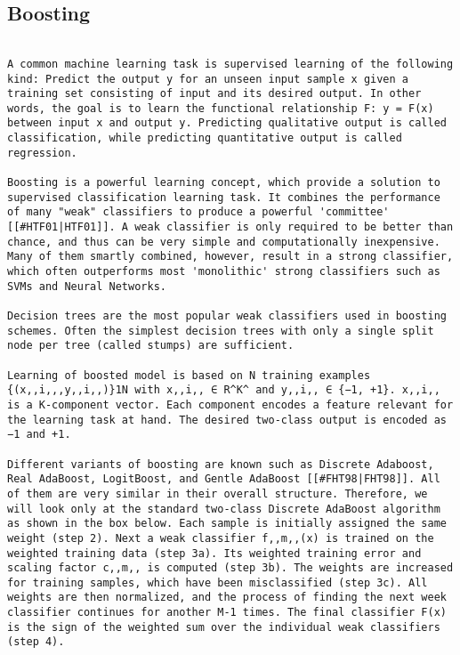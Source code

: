 \subsection{Boosting}
\begin{verbatim}

A common machine learning task is supervised learning of the following kind: Predict the output y for an unseen input sample x given a training set consisting of input and its desired output. In other words, the goal is to learn the functional relationship F: y = F(x) between input x and output y. Predicting qualitative output is called classification, while predicting quantitative output is called regression.

Boosting is a powerful learning concept, which provide a solution to supervised classification learning task. It combines the performance of many "weak" classifiers to produce a powerful 'committee' [[#HTF01|HTF01]]. A weak classifier is only required to be better than chance, and thus can be very simple and computationally inexpensive. Many of them smartly combined, however, result in a strong classifier, which often outperforms most 'monolithic' strong classifiers such as SVMs and Neural Networks.

Decision trees are the most popular weak classifiers used in boosting schemes. Often the simplest decision trees with only a single split node per tree (called stumps) are sufficient.

Learning of boosted model is based on N training examples {(x,,i,,,y,,i,,)}1N with x,,i,, ∈ R^K^ and y,,i,, ∈ {−1, +1}. x,,i,, is a K-component vector. Each component encodes a feature relevant for the learning task at hand. The desired two-class output is encoded as −1 and +1.

Different variants of boosting are known such as Discrete Adaboost, Real AdaBoost, LogitBoost, and Gentle AdaBoost [[#FHT98|FHT98]]. All of them are very similar in their overall structure. Therefore, we will look only at the standard two-class Discrete AdaBoost algorithm as shown in the box below. Each sample is initially assigned the same weight (step 2). Next a weak classifier f,,m,,(x) is trained on the weighted training data (step 3a). Its weighted training error and scaling factor c,,m,, is computed (step 3b). The weights are increased for training samples, which have been misclassified (step 3c). All weights are then normalized, and the process of finding the next week classifier continues for another M-1 times. The final classifier F(x) is the sign of the weighted sum over the individual weak classifiers (step 4).


\end{verbatim}
